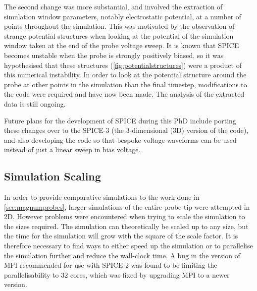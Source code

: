 \documentclass[a4paper, 11pt]{article} %
\begin{document}
	The second change was more substantial, and involved the extraction of simulation window parameters, notably electrostatic potential, at a number of points throughout the simulation.
	This was motivated by the observation of strange potential structures when looking at the potential of the simulation window taken at the end of the probe voltage sweep. 
	It is known that SPICE becomes unstable when the probe is strongly positively biased, so it was hypothesised that these structures (\cref{fig:potentialstructures}) were a product of this numerical instability. 
	In order to look at the potential structure around the probe at other points in the simulation than the final timestep, modifications to the code were required and have now been made.
	The analysis of the extracted data is still ongoing.
	
	Future plans for the development of SPICE during this PhD include porting these changes over to the SPICE-3 (the 3-dimensional (3D) version of the code), and also developing the code so that bespoke voltage waveforms can be used instead of just a linear sweep in bias voltage.
	
\subsection{\label{subsec:simscale}Simulation Scaling}
	In order to provide comparative simulations to the work done in \cref{sec:magnumprobes}, larger simulations of the entire probe tip were attempted in 2D. 
	However problems were encountered when trying to scale the simulation to the sizes required.
	The simulation can theoretically be scaled up to any size, but the time for the simulation will grow with the square of the scale factor\cite{Birdsall2005}.
	It is therefore necessary to find ways to either speed up the simulation or to parallelise the simulation further and reduce the wall-clock time.
	A bug in the version of MPI recommended for use with SPICE-2 was found to be limiting the parallelisability to 32 cores, which was fixed by upgrading MPI to a newer version.
	
\end{document}
